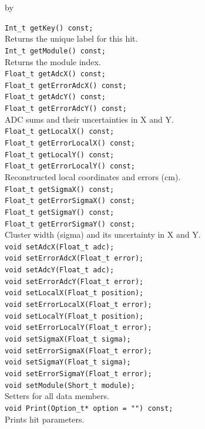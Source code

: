 \documentclass[twoside]{article}
\newcommand{\entrylabel}[1]{\mbox{\textbf{{#1}}}\hfil}%
\newenvironment{entry}
{\begin{list}{}%
    {\renewcommand{\makelabel}{\entrylabel}%
     \setlength{\labelwidth}{90pt}%
     \setlength{\leftmargin}{\labelwidth}
     \advance\leftmargin by \labelsep%
      }%
    }%
  {\end{list}}
\newcommand{\Entrylabel}[1]%
{\raisebox{0pt}[1ex][0pt]{\makebox[\labelwidth][l]%
    {\parbox[t]{\labelwidth}{\hspace{0pt}\textbf{{#1}}}}}}
\newenvironment{Entry}%
{\renewcommand{\entrylabel}{\Entrylabel}\begin{entry}}%
  {\end{entry}}
\begin{document}
\begin{Entry}
    \verb+Int_t getKey() const;+\\
    Returns the unique label for this hit.\\
    \verb+Int_t getModule() const;+\\
    Returns the module index.\\
    \verb+Float_t getAdcX() const;+\\
    \verb+Float_t getErrorAdcX() const;+\\
    \verb+Float_t getAdcY() const;+\\
    \verb+Float_t getErrorAdcY() const;+\\
    ADC sums and their uncertainties in X and Y.\\
    \verb+Float_t getLocalX() const;+\\
    \verb+Float_t getErrorLocalX() const;+\\
    \verb+Float_t getLocalY() const;+\\
    \verb+Float_t getErrorLocalY() const;+\\
    Reconstructed local coordinates and errors (cm).\\
    \verb+Float_t getSigmaX() const;+\\
    \verb+Float_t getErrorSigmaX() const;+\\
    \verb+Float_t getSigmaY() const;+\\
    \verb+Float_t getErrorSigmaY() const;+\\
    Cluster width (sigma) and its uncertainty in X and Y.\\
    \verb+void setAdcX(Float_t adc);+\\
    \verb+void setErrorAdcX(Float_t error);+\\
    \verb+void setAdcY(Float_t adc);+\\
    \verb+void setErrorAdcY(Float_t error);+\\
    \verb+void setLocalX(Float_t position);+\\
    \verb+void setErrorLocalX(Float_t error);+\\
    \verb+void setLocalY(Float_t position);+\\
    \verb+void setErrorLocalY(Float_t error);+\\
    \verb+void setSigmaX(Float_t sigma);+\\
    \verb+void setErrorSigmaX(Float_t error);+\\
    \verb+void setSigmaY(Float_t sigma);+\\
    \verb+void setErrorSigmaY(Float_t error);+\\
    \verb+void setModule(Short_t module);+\\
    Setters for all data members.\\
    \verb+void Print(Option_t* option = "") const;+\\
    Prints hit parameters.\\
\end{Entry}
\clearpage
\end{document}
